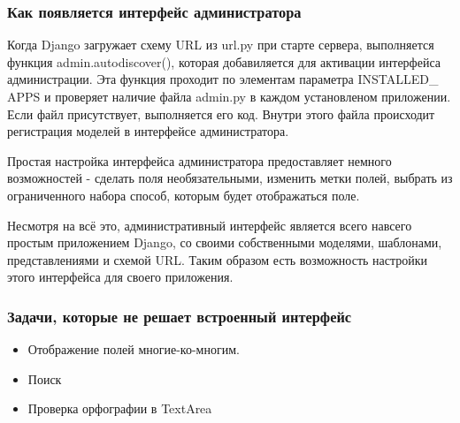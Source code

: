 \documentclass[a4paper]{report}
\begin{document}
\subsubsection{Как появляется интерфейс администратора}

Когда Django загружает схему URL из url.py  при старте сервера, выполняется функция admin.autodiscover(), которая добавиляется для активации интерфейса администрации. Эта функция проходит по элементам параметра INSTALLED\_ APPS и проверяет наличие файла admin.py в каждом установленом приложении. Если файл присутствует, выполняется его код. Внутри этого файла происходит регистрация моделей в интерфейсе администратора. %

Простая настройка интерфейса администратора предоставляет немного возможностей - сделать поля необязательными, изменить метки полей, выбрать из ограниченного набора способ, которым будет отображаться поле.

Несмотря на всё это, административный интерфейс является всего навсего простым приложением Django, со своими собственными моделями, шаблонами, представлениями и схемой URL. Таким образом есть возможность настройки этого интерфейса для своего приложения.

\subsubsection{Задачи, которые не решает встроенный интерфейс}
\begin{itemize}
	\item Отображение полей многие-ко-многим.
	\item Поиск
	\item Проверка орфографии в TextArea
\end{itemize}
\end{document}
